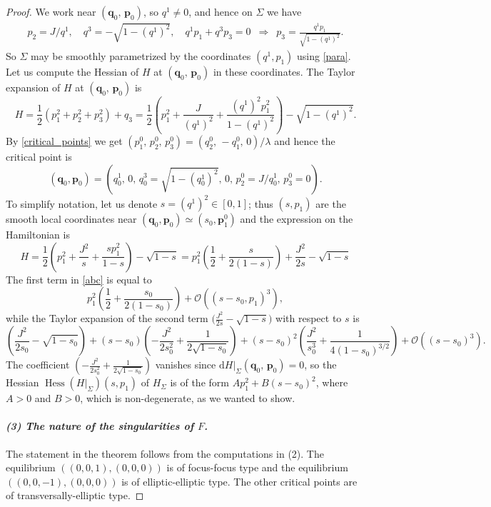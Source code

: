 \documentclass[11pt]{article}
\newcommand{\DD}{\mathrm{d}}
\begin{document}
\begin{proof}
  We work near $(\mathbf{q}_0,\,\mathbf{p}_0)$, so $q^1 \neq 0$, and
  hence on $\Sigma$ we have
  \begin{eqnarray} \label{para} p_2=J/q^1,\,\,\,\,\,\,
    q^3=-\sqrt{1-(q^1)^2},\,\,\,\,\,\, q^1p_1+q^3p_3=0\,\,\,
    \Rightarrow\,\,\, p_3=\frac{q^1p_1}{\sqrt{1-(q^1)^2}}.
  \end{eqnarray}
  So $\Sigma$ may be smoothly parametrized by the coordinates
  $(q^1,p_1)$ using \eqref{para}.  Let us compute the Hessian of $H$
  at $(\mathbf{q}_0,\, \mathbf{p}_0)$ in these coordinates.  The
  Taylor expansion of $H$ at $(\mathbf{q}_0,\, \mathbf{p}_0)$ is
$$
H=\frac{1}{2}(p_1^2+p_2^2+p_3^2)+q_3 =\frac{1}{2}\left(p_1^2
  +\frac{J}{(q^1)^2}+\frac{(q^1)^2p_1^2}{1-(q^1)^2}\right)
-\sqrt{1-(q^1)^2}.
$$
By \eqref{critical_points} we get
$(p_1^0,\,p_2^0,\,p_3^0)=(q_2^0,\,-q_1^0,\,0)/\lambda$ and hence the
critical point is
\[
(\mathbf{q}_0,\mathbf{p}_0)=
\left(q^1_0,\,0,\,q^3_0=\sqrt{1-(q^1_0)^2},\, 0,\, p_2^0=J/q^1_0,\,
  p_3^0=0 \right).
\]
To simplify notation, let us denote $s=(q^1)^2 \in [0,1]$; thus
$(s,p_1)$ are the smooth local coordinates near $(\mathbf{q}_0,
\mathbf{p}_0) \simeq (s_0, \mathbf{p}_1^0)$ and the expression on the
Hamiltonian is
\begin{equation}
  \label{abc}
  H=\frac{1}{2}\left(p_1^2+\frac{J^2}{s}+ \frac{sp_1^2}{1-s}
  \right)-\sqrt{1-s}
  = p_1^2\left(\frac{1}{2}+\frac{s}{2(1-s)}\right)+
  \frac{J^2}{2s}-\sqrt{1-s}
\end{equation}
The first term in \eqref{abc} is equal to
$$
p_1^2\left(\frac{1}{2}+\frac{s_0}{2(1-s_0)}\right)
+\mathcal{O}((s-s_0, p_1)^3),$$ while the Taylor expansion of the
second term $\Big( \frac{J^2}{2s}-\sqrt{1-s}\Big)$ with respect to $s$
is
$$
\left(\frac{J^2}{2s_0}-\sqrt{1-s_0}\right)+(s-s_0)
\left(-\frac{J^2}{2s_0^2}+\frac{1}{2\sqrt{1-s_0}}\right) +(s-s_0)^2
\left(\frac{J^2}{s_0^3} + \frac{1}{4(1-s_0)^{3/2}}
\right)+\mathcal{O}((s-s_0)^3).
$$
The coefficient
$\left(-\frac{J^2}{2s_0^2}+\frac{1}{2\sqrt{1-s_0}}\right)$ vanishes
since $\DD H|_{\Sigma}(\mathbf{q}_0,\, \mathbf{p}_0)=0$, so the
Hessian $\operatorname{Hess}(H|_{\Sigma})(s,p_1)$ of $H_{\Sigma}$ is
of the form $Ap_1^2+B(s-s_0)^2$, where $A>0$ and $B>0$, which is
non-degenerate, as we wanted to show.



\paragraph{{\em {\rm (3)} The nature of the singularities of $F$.}}
The statement in the theorem follows from the computations in (2).
The equilibrium $((0,0,1),(0,0,0))$ is of focus-focus type and the
equilibrium $((0,0,-1),(0,0,0))$ is of elliptic-elliptic type.  The
other critical points are of transversally-elliptic type.


\end{proof}
\end{document}
